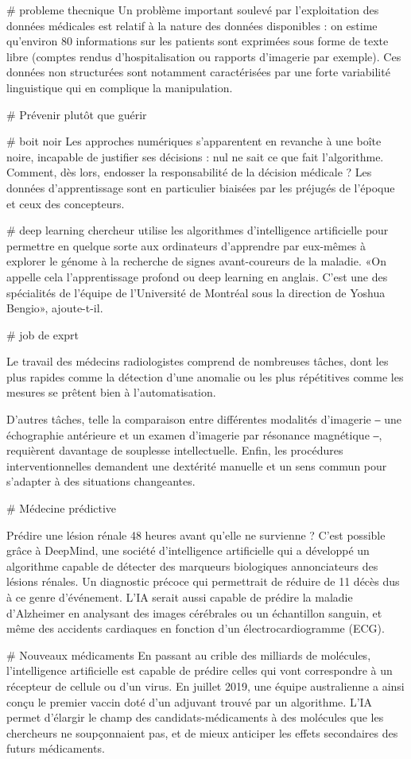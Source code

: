 # probleme thecnique
Un problème important soulevé par l’exploitation des données médicales est
relatif à la nature des données disponibles : on estime qu’environ 80 %
informations sur les patients sont exprimées sous forme de texte libre (comptes
rendus d’hospitalisation ou rapports d’imagerie par exemple). Ces données non
structurées sont notamment caractérisées par une forte variabilité linguistique
qui en complique la manipulation.

# Prévenir plutôt que guérir

# boit noir
Les approches numériques s’apparentent en revanche à une boîte noire, incapable
de justifier ses décisions : nul ne sait ce que fait l’algorithme. Comment, dès
lors, endosser la responsabilité de la décision médicale ? Les données
d’apprentissage sont en particulier biaisées par les préjugés de l’époque et
ceux des concepteurs.

# deep learning
chercheur utilise les algorithmes d’intelligence artificielle pour permettre en
quelque sorte aux ordinateurs d’apprendre par eux-mêmes à explorer le génome à
la recherche de signes avant-coureurs de la maladie. «On appelle cela
l’apprentissage profond ou deep learning en anglais. C’est une des spécialités
de l’équipe de l’Université de Montréal sous la direction de Yoshua Bengio»,
ajoute-t-il. 


# job de exprt

Le travail des médecins radiologistes comprend de nombreuses tâches, dont les
plus rapides comme la détection d'une anomalie ou les plus répétitives comme
les mesures se prêtent bien à l'automatisation.



D'autres tâches, telle la comparaison entre différentes modalités d'imagerie ‒
une échographie antérieure et un examen d'imagerie par résonance magnétique ‒,
requièrent davantage de souplesse intellectuelle. Enfin, les procédures
interventionnelles demandent une dextérité manuelle et un sens commun pour
s'adapter à des situations changeantes.


# Médecine prédictive

Prédire une lésion rénale 48 heures avant qu’elle ne survienne ? C'est possible
grâce à DeepMind, une société d'intelligence artificielle qui a développé un
algorithme capable de détecter des marqueurs biologiques annonciateurs des
lésions rénales. Un diagnostic précoce qui permettrait de réduire de 11 %
décès dus à ce genre d'événement. L'IA serait aussi capable de prédire la
maladie d'Alzheimer en analysant des images cérébrales ou un échantillon
sanguin, et même des accidents cardiaques en fonction d'un électrocardiogramme
(ECG).

# Nouveaux médicaments
En passant au crible des milliards de molécules, l'intelligence artificielle
est capable de prédire celles qui vont correspondre à un récepteur de cellule
ou d'un virus. En juillet 2019, une équipe australienne a ainsi conçu le
premier vaccin doté d'un adjuvant trouvé par un algorithme. L'IA permet
d'élargir le champ des candidats-médicaments à des molécules que les chercheurs
ne soupçonnaient pas, et de mieux anticiper les effets secondaires des futurs
médicaments.


